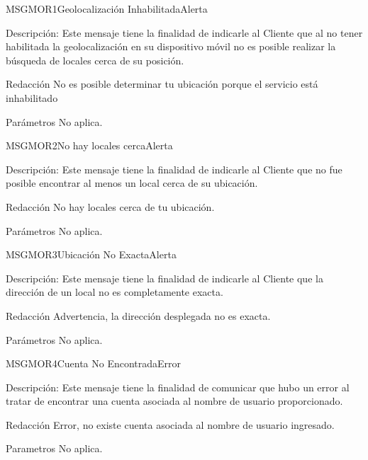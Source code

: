 \begin{mensaje}{MSGMOR1}{Geolocalización Inhabilitada}{Alerta}
	\item[Descripción:]Este mensaje tiene la finalidad de indicarle al Cliente que al no tener habilitada la geolocalización en su dispositivo móvil no es posible realizar la búsqueda de locales cerca de su posición.
	\item[Redacción]No es posible determinar tu ubicación porque el servicio está inhabilitado
	\item[Parámetros] No aplica.
\end{mensaje}

\begin{mensaje}{MSGMOR2}{No hay locales cerca}{Alerta}
	\item[Descripción:]Este mensaje tiene la finalidad de indicarle al Cliente que no fue posible encontrar al menos un local cerca de su ubicación.
	\item[Redacción]No hay locales cerca de tu ubicación.
	\item[Parámetros] No aplica.
\end{mensaje}

\begin{mensaje}{MSGMOR3}{Ubicación No Exacta}{Alerta}
	\item[Descripción:]Este mensaje tiene la finalidad de indicarle al Cliente que la dirección de un local no es completamente exacta.
	\item[Redacción]Advertencia, la dirección desplegada no es exacta.
	\item[Parámetros] No aplica.
\end{mensaje}

\begin{mensaje}{MSGMOR4}{Cuenta No Encontrada}{Error}
	\item[Descripción:]Este mensaje tiene la finalidad de comunicar que hubo un error al tratar de encontrar una cuenta asociada al nombre de usuario proporcionado.
	\item[Redacción]Error, no existe cuenta asociada al nombre de usuario ingresado.
	\item[Parametros] No aplica.
\end{mensaje}



